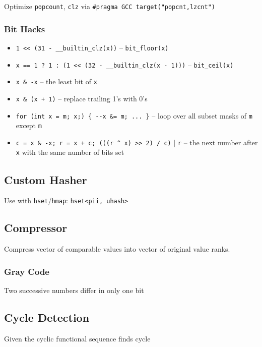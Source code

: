 Optimize \verb|popcount|, \verb|clz| via \verb|#pragma GCC target("popcnt,lzcnt")|

\subsubsection{Bit Hacks}

\vspace{1em}
\begin{itemize}
    \item \verb|1 << (31 - __builtin_clz(x))| -- \verb|bit_floor(x)|
    \item \verb|x == 1 ? 1 : (1 << (32 - __builtin_clz(x - 1)))| -- \verb|bit_ceil(x)|
    \item \verb|x & -x| -- the least bit of \verb|x|
    \item \verb|x & (x + 1)| -- replace trailing 1's with 0's
    \item \verb|for (int x = m; x;) { --x &= m; ... }| -- loop over all subset masks of \verb|m| except \verb|m|
    \item \verb|c = x & -x; r = x + c; (((r ^ x) >> 2) / c)| | \verb|r| -- the next number after \verb|x| with the same number of bits set
\end{itemize}

\subsection{Custom Hasher}
Use with \verb|hset|/\verb|hmap|: \verb|hset<pii, uhash>|

\subsection{Compressor}
Compress vector of comparable values into vector of original value ranks.

\subsubsection{Gray Code}
Two successive numbers differ in only one bit

\subsection{Cycle Detection}
Given the cyclic functional sequence finds cycle
